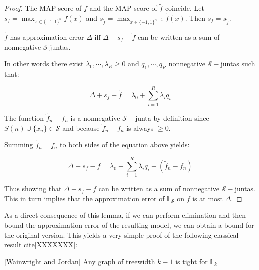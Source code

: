 \begin{proof}
The MAP score of $f$ and the MAP score of $\tilde{f}$ coincide. Let $s_f = \max_{x \in\{-1,1\}^n} f(x)$ and $s_{\tilde{f}} = \max_{x \in \{-1,1\}^{n-1}} \tilde{f}(x)$. Then $s_f = s_{\tilde{f}}$. 

$\tilde{f}$ has approximation error $\Delta$ iff $\Delta + s_f - \tilde{f}$ can be written as a sum of nonnegative $\mathcal{S}$-juntas. 

In other words there exist $\lambda_0, \cdots, \lambda_R \geq 0$ and $q_1, \cdots, q_R $ nonnegative $\mathcal{S}-$juntas such that:

\begin{equation}
\Delta + s_f  -\tilde{f} = \lambda_0 + \sum_{i=1}^R \lambda_i q_i
\end{equation}

The function $\tilde{f}_n - f_n$ is a nonnegative $\mathcal{S}-$junta by definition since $S(n) \cup \{x_n \} \in \mathcal{S} $ and because $\tilde{f}_n - f_n$ is always $\geq 0$. 

Summing $\tilde{f}_n - f_n$ to both sides of the equation above yields:

\begin{equation}
\Delta + s_f  -f = \lambda_0 + \sum_{i=1}^R \lambda_i q_i + \left( \tilde{f}_n - f_n\right)
\end{equation}

Thus showing that $\Delta + s_f - f $ can be written as a sum of nonnegative $\mathcal{S}-$juntas. This in turn implies that the approximation error of $\mathbb{L}_\mathcal{S}$ on $f$ is at most $\Delta$.
\end{proof}

As a direct consequence of this lemma, if we can perform elimination and then bound the approximation error of the resulting model, we can obtain a bound for the original version. This yields a very simple proof of the following classical result cite[XXXXXXX]:

\begin{theorem}\label{thm:wainjor}[Wainwright and Jordan]
Any graph of treewidth $k-1$ is tight for $\mathbb{L}_k$
\end{theorem}

